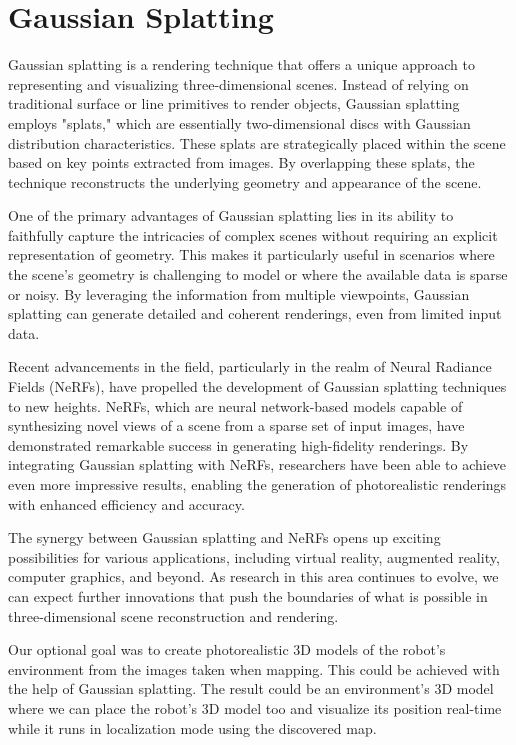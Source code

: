 \section{Gaussian Splatting}

Gaussian splatting\cite{3DGS} is a rendering technique that offers a unique approach to representing and visualizing three-dimensional scenes. Instead of relying on traditional surface or line primitives to render objects, Gaussian splatting employs "splats," which are essentially two-dimensional discs with Gaussian distribution characteristics. These splats are strategically placed within the scene based on key points extracted from images. By overlapping these splats, the technique reconstructs the underlying geometry and appearance of the scene.

One of the primary advantages of Gaussian splatting lies in its ability to faithfully capture the intricacies of complex scenes without requiring an explicit representation of geometry. This makes it particularly useful in scenarios where the scene's geometry is challenging to model or where the available data is sparse or noisy. By leveraging the information from multiple viewpoints, Gaussian splatting can generate detailed and coherent renderings, even from limited input data.

Recent advancements in the field, particularly in the realm of Neural Radiance Fields\cite{nerf} (NeRFs), have propelled the development of Gaussian splatting techniques to new heights. NeRFs, which are neural network-based models capable of synthesizing novel views of a scene from a sparse set of input images, have demonstrated remarkable success in generating high-fidelity renderings. By integrating Gaussian splatting with NeRFs, researchers have been able to achieve even more impressive results, enabling the generation of photorealistic renderings with enhanced efficiency and accuracy.

The synergy between Gaussian splatting and NeRFs opens up exciting possibilities for various applications, including virtual reality, augmented reality, computer graphics, and beyond. As research in this area continues to evolve, we can expect further innovations that push the boundaries of what is possible in three-dimensional scene reconstruction and rendering.

Our optional goal was to create photorealistic 3D models of the robot's environment from the images taken when mapping. This could be achieved with the help of Gaussian splatting. The result could be an environment's 3D model where we can place the robot's 3D model too and visualize its position real-time while it runs in localization mode using the discovered map.

